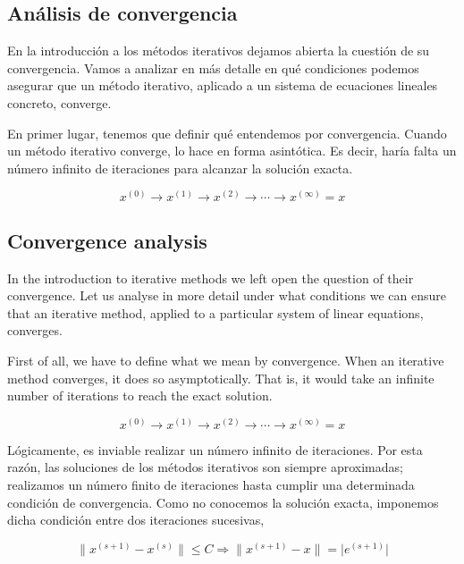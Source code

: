 \begin{paracol}{2}
\subsection{Análisis de convergencia}
En la introducción a los métodos iterativos dejamos abierta la cuestión de su convergencia. Vamos a analizar en más detalle en qué condiciones podemos asegurar que un método iterativo, aplicado a un sistema de ecuaciones lineales concreto, converge. 

En primer lugar, tenemos que definir qué entendemos por convergencia. Cuando un método iterativo converge, lo hace en forma asintótica. Es decir, haría falta un número infinito de iteraciones para alcanzar la solución exacta.

\begin{equation*}
x^{(0)}\rightarrow x^{(1)} \rightarrow x^{(2)}\rightarrow \cdots \rightarrow x^{(\infty)}=x
\end{equation*}

\switchcolumn

\subsection{Convergence analysis}
In the introduction to iterative methods we left open the question of their convergence. Let us analyse in more detail under what conditions we can ensure that an iterative method, applied to a particular system of linear equations, converges. 

First of all, we have to define what we mean by convergence. When an iterative method converges, it does so asymptotically. That is, it would take an infinite number of iterations to reach the exact solution.

\begin{equation*}
x^{(0)}\rightarrow x^{(1)} \rightarrow x^{(2)}\rightarrow \cdots \rightarrow x^{(\infty)}=x
\end{equation*}

\switchcolumn

Lógicamente, es inviable realizar un número infinito de iteraciones. Por esta razón, las soluciones de los métodos iterativos son siempre aproximadas; realizamos un número finito de iteraciones hasta cumplir una determinada condición de convergencia. Como no conocemos la solución exacta, imponemos dicha condición entre dos iteraciones sucesivas,

\begin{equation*}
 \lVert x^{(s+1)}-x^{(s)}\rVert \leq C \Rightarrow  \lVert x^{(s+1)}-x\rVert = \lvert e^{(s+1)} \rvert
\end{equation*}


\end{paracol}
